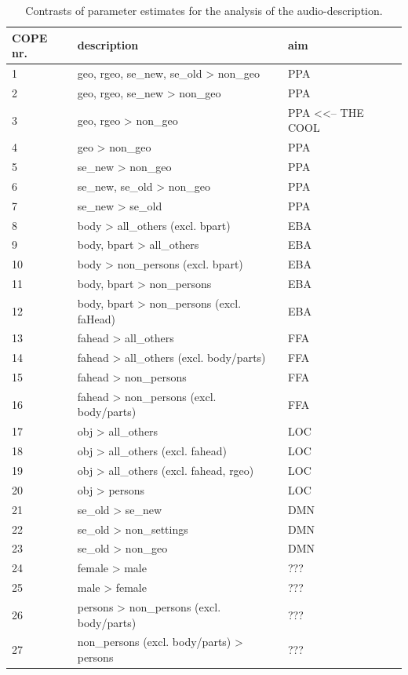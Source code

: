 \documentclass[english]{article}
\begin{document}
\begin{table}
\caption{Contrasts of parameter estimates for the analysis of the audio-description.}
\begin{tabular}{lll}
\toprule
\textbf{COPE nr.} & \textbf{description} & \textbf{aim} \\
\midrule
1 & geo, rgeo, se\_new, se\_old > non\_geo & PPA \\
2 & geo, rgeo, se\_new > non\_geo & PPA \\
3 & geo, rgeo > non\_geo & PPA <<-- THE COOL \\
4 & geo > non\_geo & PPA \\
5 & se\_new > non\_geo & PPA \\
6 & se\_new, se\_old > non\_geo & PPA \\
7 & se\_new > se\_old & PPA \\
8 & body > all\_others (excl. bpart) & EBA \\
9 & body, bpart > all\_others & EBA \\
10 & body > non\_persons (excl. bpart) & EBA \\
11 & body, bpart > non\_persons & EBA \\
12 & body, bpart > non\_persons (excl. faHead) & EBA \\
13 & fahead > all\_others & FFA \\
14 & fahead > all\_others (excl. body/parts) & FFA \\
15 & fahead > non\_persons & FFA \\
16 & fahead > non\_persons (excl. body/parts) & FFA \\
17 & obj > all\_others & LOC \\
18 & obj > all\_others (excl. fahead) & LOC \\
19 & obj > all\_others (excl. fahead, rgeo) & LOC \\
20 & obj > persons & LOC \\
21 & se\_old > se\_new & DMN \\
22 & se\_old > non\_settings & DMN \\
23 & se\_old > non\_geo & DMN \\
24 & female > male & ??? \\
25 & male > female & ??? \\
26 & persons > non\_persons (excl. body/parts) & ??? \\
27 & non\_persons (excl. body/parts) > persons & ??? \\

\end{tabular}
\end{table}
\end{document}
